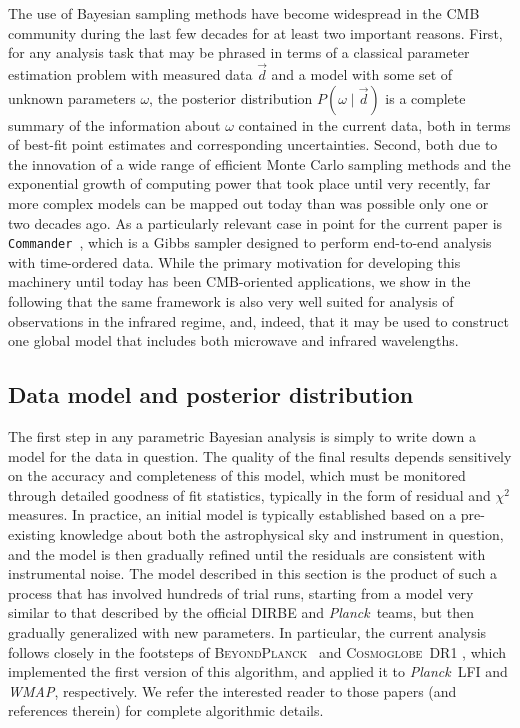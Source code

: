 \documentclass{aa}
\def\commander{\texttt{Commander}}
\def\Planck{\textit{Planck}}
\def\WMAP{\textit{WMAP}}
\newcommand{\dv}[0]{\vec{d}}
\newcommand{\BP}{\textsc{BeyondPlanck}}
\newcommand{\cosmoglobe}{\textsc{Cosmoglobe}}
\begin{document}
The use of Bayesian sampling methods have become widespread in the CMB
community \citep[e.g.,][]{cosmomc,dunkley2009b,handley:2015,planck2014-a12,millea:2019,planck2016-l06,Torrado:2020dgo,bp01,watts2023_dr1} during the last few decades for at least two important
reasons. First, for any analysis task that may be phrased in terms of
a classical parameter estimation problem with measured data $\dv$ and a
model with some set of unknown parameters $\omega$, the posterior
distribution $P(\omega\mid\dv)$ is a complete summary of the
information about $\omega$ contained in the current data, both in
terms of best-fit point estimates and corresponding
uncertainties. Second, both due to the innovation of a wide range of
efficient Monte Carlo sampling methods and the exponential growth of
computing power that took place until very recently, far more complex
models can be mapped out today than was possible only one or two
decades ago. As a particularly relevant case in point for the current
paper is \commander\ \citep{eriksen:2004,seljebotn:2019,bp03}, which is a Gibbs sampler designed to perform
end-to-end analysis with time-ordered data. While the primary
motivation for developing this machinery until today has been
CMB-oriented applications, we show in the following that the same
framework is also very well suited for analysis of observations in the
infrared regime, and, indeed, that it may be used to construct one
global model that includes both microwave and infrared wavelengths.

\subsection{Data model and posterior distribution}
\label{sec:datamodel}

The first step in any parametric Bayesian analysis is simply to write
down a model for the data in question. The quality of the
final results depends sensitively on the accuracy and completeness of
this model, which must be monitored through detailed goodness of fit
statistics, typically in the form of residual and $\chi^2$
measures. In practice, an initial model is typically established based
on a pre-existing knowledge about both the astrophysical sky and
instrument in question, and the model is then gradually refined until
the residuals are consistent with instrumental noise. The model
described in this section is the product of such a process
that has involved hundreds of trial runs, starting from a model very
similar to that described by the official DIRBE and \Planck\ teams,
but then gradually generalized with new parameters. In particular, the
current analysis follows closely in the footsteps of
\BP\ \citep{bp01} and \cosmoglobe\ DR1 \citep{watts2023_dr1}, which
implemented the first version of this algorithm, and applied it to
\Planck\ LFI and \WMAP, respectively. We refer the interested reader
to those papers (and references therein) for complete algorithmic
details.
\end{document}
